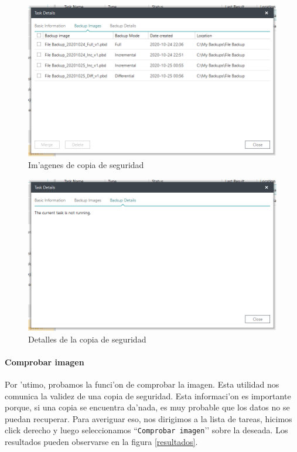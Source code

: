 \documentclass[11pt]{article}
\begin{document}
    \begin{figure}[H]
		\centering
		\includegraphics[scale=.56]{Images/easeus/pendrive/18-t2_d2.png}
		\caption{Im'agenes de copia de seguridad}
	\end{figure}

    \begin{figure}[H]
		\centering
		\includegraphics[scale=.56]{Images/easeus/pendrive/19-t2_d3.png}
		\caption{Detalles de la copia de seguridad}
	\end{figure}
	
	
	\paragraph{Comprobar imagen}
	
    Por 'utimo, probamos la funci'on de comprobar la imagen. Esta utilidad nos comunica la validez de una copia de seguridad. Esta informaci'on es importante porque, si una copia se encuentra da'nada, es muy probable que los datos no se puedan recuperar. Para averiguar eso, nos dirigimos a la lista de tareas, hicimos click derecho y luego seleccionamos ``\texttt{Comprobar imagen}’’ sobre la deseada. Los resultados pueden observarse en la figura \ref{resultados}.
\end{document}
